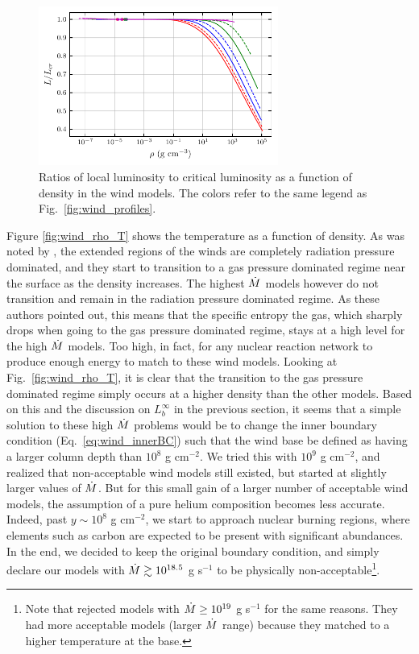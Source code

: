 \documentclass[../main.tex]{subfiles}
\begin{document}
\begin{figure}[htb!]
    \centering
    \includegraphics[width=0.7\textwidth]{figures/wind_L_Lcrit.pdf}
    \caption[Wind local to critical luminosity ratios]{Ratios of local luminosity to critical luminosity as a function of density in the wind models. The colors refer to the same legend as Fig.~\ref{fig:wind_profiles}.}
    \label{fig:wind_L_Lcrit}
\end{figure}

Figure \ref{fig:wind_rho_T} shows the temperature as a function of density. As was noted by \citet{Paczynski1986b}, the extended regions of the winds are completely radiation pressure dominated, and they start to transition to a gas pressure dominated regime near the surface as the density increases. The highest $\dot{M}$ models however do not transition and remain in the radiation pressure dominated regime. As these authors pointed out, this means that the specific entropy the gas, which sharply drops when going to the gas pressure dominated regime, stays at a high level for the high $\dot{M}$ models. Too high, in fact, for any nuclear reaction network to produce enough energy to match to these wind models. Looking at Fig.~\ref{fig:wind_rho_T}, it is clear that the transition to the gas pressure dominated regime simply occurs at a higher density than the other models. Based on this and the discussion on $L
_b^\infty$ in the previous section, it seems that a simple solution to these high $\dot{M}$ problems would be to change the inner boundary condition (Eq.~\ref{eq:wind_innerBC}) such that the wind base be defined as having a larger column depth than $10^8$ g cm$^{-2}$. We tried this with $10^9$ g cm$^{-2}$, and realized that non-acceptable wind models still existed, but started at slightly larger values of $\dot{M}$. But for this small gain of a larger number of acceptable wind models, the assumption of a pure helium composition becomes less accurate. Indeed, past $y\sim 10
^8$ g cm$^{-2}$, we start to approach nuclear burning regions, where elements such as carbon are expected to be present with significant abundances.  In the end, we decided to keep the original boundary condition, and simply declare our models with $\dot{M}\gtrsim 10^{18.5}$ g s$^{-1}$ to be physically non-acceptable\footnote{Note that \citet{Paczynski1986b} rejected models with $\dot{M}\geq 10^{19}$ g s$^{-1}$ for the same reasons. They had more acceptable models (larger $\dot{M}$ range) because they matched to a higher temperature at the base.}. 
\end{document}
